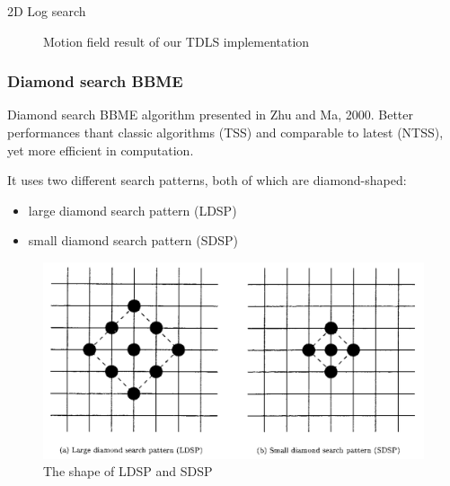 \documentclass[aspectratio=1610,xcolor=dvipsnames]{beamer}
\begin{document}
\begin{frame}{2D Log search}
\begin{figure}
\begin{minipage}{.45\textwidth}
            \label{fig:bbme-2-res}
		\end{minipage}
        \label{fig:bbme-2}
        \caption{Motion field result of our TDLS implementation}
	\end{figure}
\end{frame}

\subsubsection*{Diamond search BBME}
\begin{frame}{Diamond search}
	BBME algorithm presented in Zhu and Ma, 2000. Better performances thant classic algorithms (TSS) and comparable to latest (NTSS), yet more efficient in computation.

    \bigskip
    It uses two different search patterns, both of which are diamond-shaped:
    \begin{itemize}
        \item large diamond search pattern (LDSP)
        \item small diamond search pattern (SDSP)
    \end{itemize}
    \begin{figure}
        \centering
        \includegraphics[keepaspectratio,width=.5\linewidth]{images/ds-search-patterns.png}
        \caption{The shape of LDSP and SDSP}
    \end{figure}
\end{frame}
\end{document}
